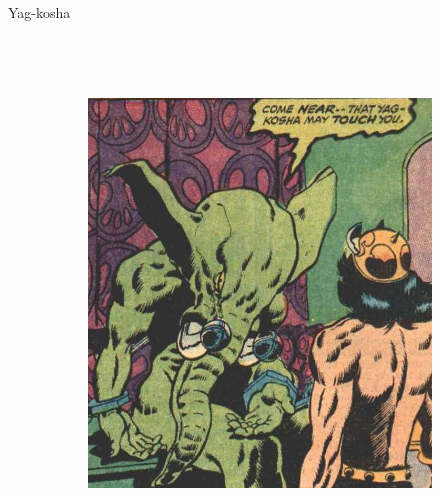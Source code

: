 \begin{frame}{Yag-kosha}
\begin{columns}
\begin{figure}[htp]
\begin{subfigure}[b]{0.3\textwidth}
 \end{subfigure}
~
 \begin{subfigure}[b]{0.25\textwidth}
   \includegraphics[width=\textwidth]{img/yogh/CTB}
 \end{subfigure}
\end{figure}
\end{columns}
\end{frame}

